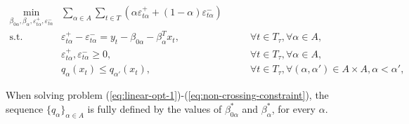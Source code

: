 \begin{eqnarray}
\label{eq:non-crossing-quantiles1}
\min_{\beta_{0\alpha},\beta_\alpha,\varepsilon_{t\alpha}^{+}, \varepsilon_{t\alpha}^{-}} &  \sum_{\alpha \in A} \sum_{t \in T}\left(\alpha \varepsilon_{t \alpha}^{+}+(1-\alpha)\varepsilon_{t \alpha}^{-}\right) & \label{eq:linear-opt-1} \\
\mbox{s.t. } & \varepsilon_{t \alpha}^{+}-\varepsilon_{t \alpha}^{-}=y_{t} - \beta_{0\alpha} - \beta_{\alpha}^T x_{t}, & \qquad\forall t \in T_\tau,\forall \alpha \in A,\\
& \varepsilon_{t\alpha}^+,\varepsilon_{t\alpha}^- \geq 0, & \qquad\forall t \in T_\tau,\forall \alpha \in A,\\ \label{eq:non-crossing-constraint}
& q_{\alpha}(x_t) \leq q_{\alpha'}(x_t), & \qquad \forall t \in T_\tau, \forall (\alpha, \alpha') \in A \times A,  \alpha < \alpha', 
\end{eqnarray}


When solving problem (\ref{eq:linear-opt-1})-(\ref{eq:non-crossing-constraint}), the sequence $\{ q_\alpha \}_{\alpha \in A}$ is fully defined by the values of $\beta^*_{0\alpha}$ and $\beta^*_\alpha$, for every $\alpha$.



